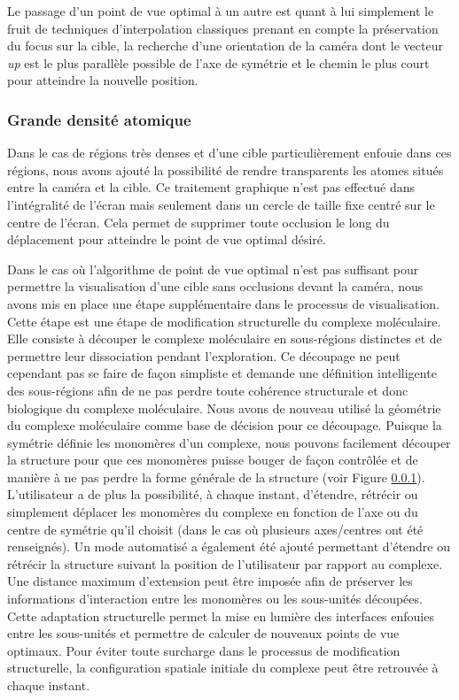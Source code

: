 Le passage d'un point de vue optimal à un autre est quant à lui simplement le fruit de techniques d'interpolation classiques prenant en compte la préservation du focus sur la cible, la recherche d'une orientation de la caméra dont le vecteur \textit{up} est le plus parallèle possible de l'axe de symétrie et le chemin le plus court pour atteindre la nouvelle position.

\subsubsection{Grande densité atomique}

Dans le cas de régions très denses et d'une cible particulièrement enfouie dans ces régions, nous avons ajouté la possibilité de rendre transparents les atomes situés entre la caméra et la cible. Ce traitement graphique n'est pas effectué dans l'intégralité de l'écran mais seulement dans un cercle de taille fixe centré sur le centre de l'écran. Cela permet de supprimer toute occlusion le long du déplacement pour atteindre le point de vue optimal désiré.

Dans le cas où l'algorithme de point de vue optimal n'est pas suffisant pour permettre la visualisation d'une cible sans occlusions devant la caméra, nous avons mis en place une étape supplémentaire dans le processus de visualisation. Cette étape est une étape de modification structurelle du complexe moléculaire. Elle consiste à découper le complexe moléculaire en sous-régions distinctes et de permettre leur dissociation pendant l'exploration. Ce découpage ne peut cependant pas se faire de façon simpliste et demande une définition intelligente des sous-régions afin de ne pas perdre toute cohérence structurale et donc biologique du complexe moléculaire. Nous avons de nouveau utilisé la géométrie du complexe moléculaire comme base de décision pour ce découpage. Puisque la symétrie définie les monomères d'un complexe, nous pouvons facilement découper la structure pour que ces monomères puisse bouger de façon contrôlée et de manière à ne pas perdre la forme générale de la structure (voir Figure \ref{}). L'utilisateur a de plus la possibilité, à chaque instant, d'étendre, rétrécir ou simplement déplacer les monomères du complexe en fonction de l'axe ou du centre de symétrie qu'il choisit (dans le cas où plusieurs axes/centres ont été renseignés). Un mode automatisé a également été ajouté permettant d'étendre ou rétrécir la structure suivant la position de l'utilisateur par rapport au complexe. Une distance maximum d'extension peut être imposée afin de préserver les informations d'interaction entre les monomères ou les sous-unités découpées. Cette adaptation structurelle permet la mise en lumière des interfaces enfouies entre les sous-unités et permettre de calculer de nouveaux points de vue optimaux. Pour éviter toute surcharge dans le processus de modification structurelle, la configuration spatiale initiale du complexe peut être retrouvée à chaque instant.

